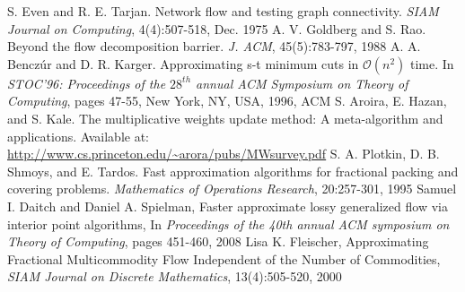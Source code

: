 \documentclass[11pt]{article}
\begin{document}
\begin{thebibliography}{99}
 S. Even and R. E. Tarjan. Network flow and testing graph connectivity. {\em SIAM Journal on Computing}, 4(4):507-518, Dec. 1975
 A. V. Goldberg and S. Rao. Beyond the flow decomposition barrier. {\em J. ACM}, 45(5):783-797, 1988
 A. A. Bencz\'{u}r and D. R. Karger. Approximating s-t minimum cuts in $\mathcal{O}\left( n^{2}\right)$ time. In {\em STOC'96: Proceedings of the $28^{th}$ annual ACM Symposium on Theory of Computing}, pages 47-55, New York, NY, USA, 1996, ACM
 S. Aroira, E. Hazan, and S. Kale. The multiplicative weights update method: A meta-algorithm and applications. Available at: \url{http://www.cs.princeton.edu/~arora/pubs/MWsurvey.pdf}
 S. A. Plotkin, D. B. Shmoys, and E. Tardos. Fast approximation algorithms for fractional packing and covering problems. {\em Mathematics of Operations Research}, 20:257-301, 1995
Samuel I. Daitch and Daniel A. Spielman, Faster approximate lossy generalized flow via interior point algorithms, In {\em Proceedings of the 40th annual ACM symposium on Theory of Computing}, pages 451-460, 2008 
Lisa K. Fleischer, Approximating Fractional Multicommodity Flow Independent of the Number of Commodities, {\em SIAM Journal on Discrete Mathematics}, 13(4):505-520, 2000
\end{thebibliography}
\end{document}
